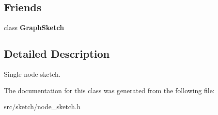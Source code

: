 \subsection*{Friends}
\begin{DoxyCompactItemize}
\item 
\hypertarget{classall__distance__sketch_1_1NodeSketch_af8070bfbe7b00c7838a9a7605e361af2}{}class {\bfseries Graph\+Sketch}\label{classall__distance__sketch_1_1NodeSketch_af8070bfbe7b00c7838a9a7605e361af2}

\end{DoxyCompactItemize}


\subsection{Detailed Description}
Single node sketch. 

The documentation for this class was generated from the following file\+:\begin{DoxyCompactItemize}
\item 
src/sketch/node\+\_\+sketch.\+h\end{DoxyCompactItemize}
